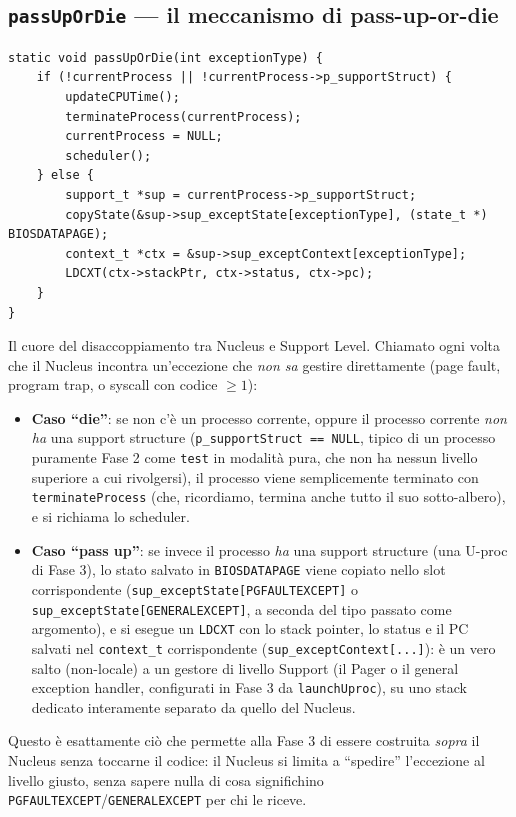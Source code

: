 \documentclass[11pt,a4paper]{article}
\newcommand{\code}[1]{\texttt{#1}}
\newcommand{\func}[1]{\textbf{\texttt{#1}}}
\begin{document}
\subsection{\func{passUpOrDie} --- il meccanismo di pass-up-or-die}
\begin{lstlisting}
static void passUpOrDie(int exceptionType) {
    if (!currentProcess || !currentProcess->p_supportStruct) {
        updateCPUTime();
        terminateProcess(currentProcess);
        currentProcess = NULL;
        scheduler();
    } else {
        support_t *sup = currentProcess->p_supportStruct;
        copyState(&sup->sup_exceptState[exceptionType], (state_t *) BIOSDATAPAGE);
        context_t *ctx = &sup->sup_exceptContext[exceptionType];
        LDCXT(ctx->stackPtr, ctx->status, ctx->pc);
    }
}
\end{lstlisting}
Il cuore del disaccoppiamento tra Nucleus e Support Level. Chiamato ogni
volta che il Nucleus incontra un'eccezione che \emph{non sa} gestire
direttamente (page fault, program trap, o syscall con codice $\ge 1$):
\begin{itemize}
\item \textbf{Caso ``die''}: se non c'è un processo corrente, oppure il
  processo corrente \emph{non ha} una support structure
  (\code{p\_supportStruct == NULL}, tipico di un processo puramente Fase 2
  come \code{test} in modalità pura, che non ha nessun livello superiore a
  cui rivolgersi), il processo viene semplicemente terminato con
  \code{terminateProcess} (che, ricordiamo, termina anche tutto il suo
  sotto-albero), e si richiama lo scheduler.
\item \textbf{Caso ``pass up''}: se invece il processo \emph{ha} una
  support structure (una U-proc di Fase 3), lo stato salvato in
  \code{BIOSDATAPAGE} viene copiato nello slot corrispondente
  (\code{sup\_exceptState[PGFAULTEXCEPT]} o
  \code{sup\_exceptState[GENERALEXCEPT]}, a seconda del tipo passato come
  argomento), e si esegue un \code{LDCXT} con lo stack pointer, lo status e
  il PC salvati nel \code{context\_t} corrispondente
  (\code{sup\_exceptContext[...]}): è un vero salto (non-locale) a un
  gestore di livello Support (il Pager o il general exception handler,
  configurati in Fase 3 da \code{launchUproc}), su uno stack dedicato
  interamente separato da quello del Nucleus.
\end{itemize}
Questo è esattamente ciò che permette alla Fase 3 di essere costruita
\emph{sopra} il Nucleus senza toccarne il codice: il Nucleus si limita a
``spedire'' l'eccezione al livello giusto, senza sapere nulla di cosa
significhino \code{PGFAULTEXCEPT}/\code{GENERALEXCEPT} per chi le riceve.
\end{document}
